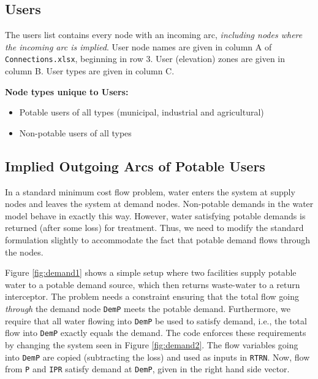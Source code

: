 \documentclass[11pt]{article}
\newcommand{\connections}{\texttt{Connections.xlsx}}
\begin{document}
\subsection{Users}
\label{ssec:users}

The users list contains every node with an incoming arc, \emph{including nodes where the incoming arc is implied}.
User node names are given in column A of \connections, beginning in row 3.
User (elevation) zones are given in column B.
User types are given in column C.

\textbf{Node types unique to Users:}
\begin{itemize}
	\item Potable users of all types (municipal, industrial and agricultural)
	\item Non-potable users of all types
\end{itemize}

\subsection{Implied Outgoing Arcs of Potable Users}
\label{ssec:potableusers}

In a standard minimum cost flow problem, water enters the system at supply nodes and leaves the system at demand nodes.
Non-potable demands in the water model behave in exactly this way.
However, water satisfying potable demands is returned (after some loss) for treatment.
Thus, we need to modify the standard formulation slightly to accommodate the fact that potable demand flows through the nodes.

Figure \ref{fig:demand1} shows a simple setup where two facilities supply potable water to a potable demand source, which then returns waste-water to a return interceptor.
The problem needs a constraint ensuring that the total flow going \emph{through} the demand node \texttt{DemP} meets the potable demand.
Furthermore, we require that all water flowing into \texttt{DemP} be used to satisfy demand, i.e., the total flow into \texttt{DemP} exactly equals the demand.
The code enforces these requirements by changing the system seen in Figure \ref{fig:demand2}.
The flow variables going into \texttt{DemP} are copied (subtracting the loss) and used as inputs in \texttt{RTRN}.
Now, flow from \texttt{P} and \texttt{IPR} satisfy demand at \texttt{DemP}, given in the right hand side vector.
\end{document}
